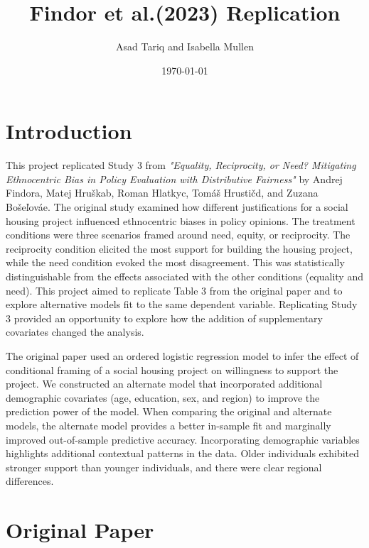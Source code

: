 \documentclass[titlepage]{article}
\title{Findor et al.(2023) Replication}
\author{Asad Tariq and Isabella Mullen}
\date{\today}
\begin{document}
\begin{titlepage}
    \maketitle
\end{titlepage}

\newpage

\tableofcontents

\newpage

\section{Introduction}
This project replicated Study 3 from \textit{"Equality, Reciprocity, or Need? Mitigating Ethnocentric Bias in Policy Evaluation with  Distributive Fairness"} by Andrej Findora, Matej Hruškab, Roman Hlatkyc, Tomáš Hrustičd, and Zuzana Bošeľováe. The original study examined how different justifications for a social housing project influenced ethnocentric biases in policy opinions. The treatment conditions were three scenarios framed around need, equity, or reciprocity. The reciprocity condition elicited the most support for building the housing project, while the need condition evoked the most disagreement. This was statistically distinguishable from the effects associated with the other conditions (equality and need). This project aimed to replicate Table 3 from the original paper and to explore alternative models fit to the same dependent variable. Replicating Study 3 provided an opportunity to explore how the addition of supplementary covariates changed the analysis.

\justify
The original paper used an ordered logistic regression model to infer the effect of conditional framing of a social housing project on willingness to support the project. We constructed an alternate model that incorporated additional demographic covariates (age, education, sex, and region) to improve the prediction power of the model. When comparing the original and alternate models, the alternate model provides a better in-sample fit and marginally improved out-of-sample predictive accuracy. Incorporating demographic variables highlights additional contextual patterns in the data. Older individuals exhibited stronger support than younger individuals, and there were clear regional differences.

\section{Original Paper}
\end{document}
